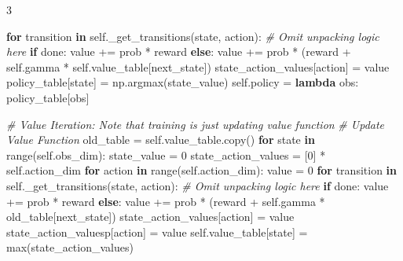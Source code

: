 \documentclass{article}
\newenvironment{Shaded}{\CodeFontSize\setlength{\topsep}{\CodeBlockSkip}\setlength{\partopsep}{0pt}}{}
\newcommand{\BuiltInTok}[1]{\textcolor[rgb]{0.00,0.50,0.00}{#1}}
\newcommand{\CommentTok}[1]{\textcolor[rgb]{0.38,0.63,0.69}{\textit{#1}}}
\newcommand{\ControlFlowTok}[1]{\textcolor[rgb]{0.00,0.44,0.13}{\textbf{#1}}}
\newcommand{\DecValTok}[1]{\textcolor[rgb]{0.25,0.63,0.44}{#1}}
\newcommand{\KeywordTok}[1]{\textcolor[rgb]{0.00,0.44,0.13}{\textbf{#1}}}
\newcommand{\NormalTok}[1]{#1}
\newcommand{\OperatorTok}[1]{\textcolor[rgb]{0.40,0.40,0.40}{#1}}
\newcommand{\VariableTok}[1]{\textcolor[rgb]{0.10,0.09,0.49}{#1}}
\newcommand{\CodeFontSize}{\fontsize{4.8}{5.6}\selectfont}
\newcommand{\NumColumns}{3}  %
\newlength{\CodeBlockSkip}
\begin{document}
\begin{multicols*}{\NumColumns}
\begin{Shaded}
\begin{Highlighting}[]
    \ControlFlowTok{for}\NormalTok{ transition }\KeywordTok{in} \VariableTok{self}\NormalTok{.\_get\_transitions(state, action):}
      \CommentTok{\# Omit unpacking logic here}
      \ControlFlowTok{if}\NormalTok{ done:}
\NormalTok{        value }\OperatorTok{+=}\NormalTok{ prob }\OperatorTok{*}\NormalTok{ reward}
      \ControlFlowTok{else}\NormalTok{:}
\NormalTok{        value }\OperatorTok{+=}\NormalTok{ prob }\OperatorTok{*}\NormalTok{ (reward }\OperatorTok{+} \VariableTok{self}\NormalTok{.gamma }\OperatorTok{*} \VariableTok{self}\NormalTok{.value\_table[next\_state])}
\NormalTok{    state\_action\_values[action] }\OperatorTok{=}\NormalTok{ value}
\NormalTok{  policy\_table[state] }\OperatorTok{=}\NormalTok{ np.argmax(state\_value)}
\VariableTok{self}\NormalTok{.policy }\OperatorTok{=} \KeywordTok{lambda}\NormalTok{ obs: policy\_table[obs]}
\end{Highlighting}
\end{Shaded}

\begin{Shaded}
\begin{Highlighting}[]
\CommentTok{\# Value Iteration: Note that training is just updating value function}
\CommentTok{\# Update Value Function}
\NormalTok{old\_table }\OperatorTok{=} \VariableTok{self}\NormalTok{.value\_table.copy()}
\ControlFlowTok{for}\NormalTok{ state }\KeywordTok{in} \BuiltInTok{range}\NormalTok{(}\VariableTok{self}\NormalTok{.obs\_dim):}
\NormalTok{  state\_value }\OperatorTok{=} \DecValTok{0}
\NormalTok{  state\_action\_values }\OperatorTok{=}\NormalTok{ [}\DecValTok{0}\NormalTok{] }\OperatorTok{*} \VariableTok{self}\NormalTok{.action\_dim}
  \ControlFlowTok{for}\NormalTok{ action }\KeywordTok{in} \BuiltInTok{range}\NormalTok{(}\VariableTok{self}\NormalTok{.action\_dim):}
\NormalTok{    value }\OperatorTok{=} \DecValTok{0}
    \ControlFlowTok{for}\NormalTok{ transition }\KeywordTok{in} \VariableTok{self}\NormalTok{.\_get\_transitions(state, action):}
      \CommentTok{\# Omit unpacking logic here}
      \ControlFlowTok{if}\NormalTok{ done:}
\NormalTok{        value }\OperatorTok{+=}\NormalTok{ prob }\OperatorTok{*}\NormalTok{ reward}
      \ControlFlowTok{else}\NormalTok{:}
\NormalTok{          value }\OperatorTok{+=}\NormalTok{ prob }\OperatorTok{*}\NormalTok{ (reward }\OperatorTok{+} \VariableTok{self}\NormalTok{.gamma }\OperatorTok{*}\NormalTok{ old\_table[next\_state])}
\NormalTok{      state\_action\_values[action] }\OperatorTok{=}\NormalTok{ value}
\NormalTok{    state\_action\_valuesp[action] }\OperatorTok{=}\NormalTok{ value}
  \VariableTok{self}\NormalTok{.value\_table[state] }\OperatorTok{=} \BuiltInTok{max}\NormalTok{(state\_action\_values)}
\end{Highlighting}
\end{Shaded}


\end{multicols*}
\end{document}
